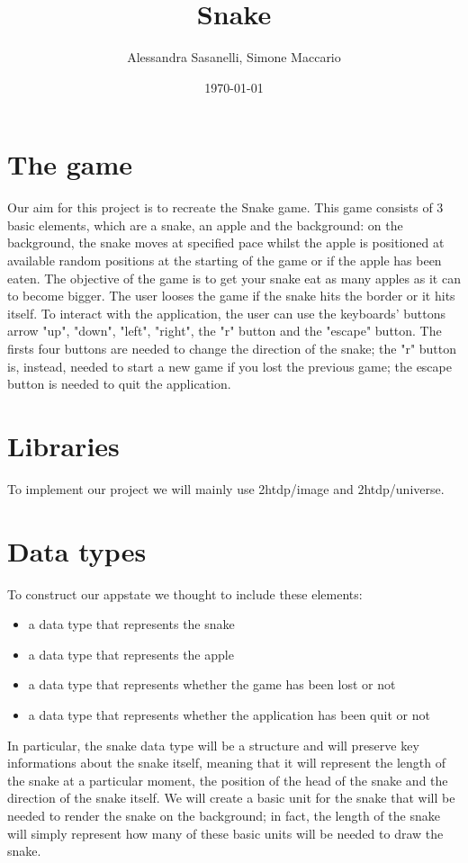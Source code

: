\documentclass{article}
\title{Snake}
\author{Alessandra Sasanelli, Simone Maccario}
\date{\today}
\begin{document}
	\maketitle
	
	\section{The game}
	Our aim for this project is to recreate the Snake game.
	This game consists of 3 basic elements, which are a snake, an apple and the background: on the background, the snake moves at specified pace whilst the apple is positioned at available random positions at the starting of the game or if the apple has been eaten.
	The objective of the game is to get your snake eat as many apples as it can to become bigger. The user looses the game if the snake hits the border or it hits itself.
	To interact with the application, the user can use the keyboards' buttons arrow "up", "down", "left", "right", the "r" button and the "escape" button. 
	The firsts four buttons are needed to change the direction of the snake; the "r" button is, instead, needed to start a new game if you lost the previous game; the escape button is needed to quit the application.
	\section{Libraries}
	To implement our project we will mainly use 2htdp/image and 2htdp/universe.
	\section{Data types}
	To construct our appstate we thought to include these elements:
	\begin{itemize}
		\item a data type that represents the snake
		\item a data type that represents the apple
		\item a data type that represents whether the game has been lost or not
		\item a data type that represents whether the application has been quit or not
	\end{itemize}
	
	In particular, the snake data type will be a structure and will preserve key informations about the snake itself, meaning that it will represent the length of the snake at a particular moment, the position of the head of the snake and the direction of the snake itself.
	We will create a basic unit for the snake that will be needed to render the snake on the background; in fact, the length of the snake will simply represent how many of these basic units will be needed to draw the snake. 
	
\end{document}

